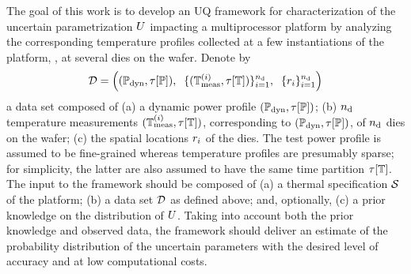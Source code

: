 The goal of this work is to develop an UQ framework for characterization of the uncertain parametrization $U$ impacting a multiprocessor platform by analyzing the corresponding temperature profiles collected at a few instantiations of the platform, \eg, at several dies on the wafer. Denote by
\[
  \mathcal{D} = \left( (\mathbb{P}_{\text{dyn}}, \tau[\mathbb{P}]), \; \; \{ (\mathbb{T}^{(i)}_{\text{meas}}, \tau[\mathbb{T}]) \}_{i = 1}^{n_\text{d}}, \; \; \{ r_i \}_{i = 1}^{n_\text{d}} \right)
\]
a data set composed of (a) a dynamic power profile $(\mathbb{P}_{\text{dyn}}, \tau[\mathbb{P}])$; (b) ${n_\text{d}}$ temperature measurements $(\mathbb{T}^{(i)}_{\text{meas}}, \tau[\mathbb{T}])$, corresponding to $(\mathbb{P}_{\text{dyn}}, \tau[\mathbb{P}])$, of ${n_\text{d}}$ dies on the wafer; (c) the spatial locations  $r_i$ of the dies. The test power profile is assumed to be fine-grained whereas temperature profiles are presumably sparse; for simplicity, the latter are also assumed to have the same time partition $\tau[\mathbb{T}]$. The input to the framework should be composed of (a) a thermal specification $\mathcal{S}$ of the platform; (b) a data set $\mathcal{D}$ as defined above; and, optionally, (c) a prior knowledge on the distribution of $U$. Taking into account both the prior knowledge and observed data, the framework should deliver an estimate of the probability distribution of the uncertain parameters with the desired level of accuracy and at low computational costs.

